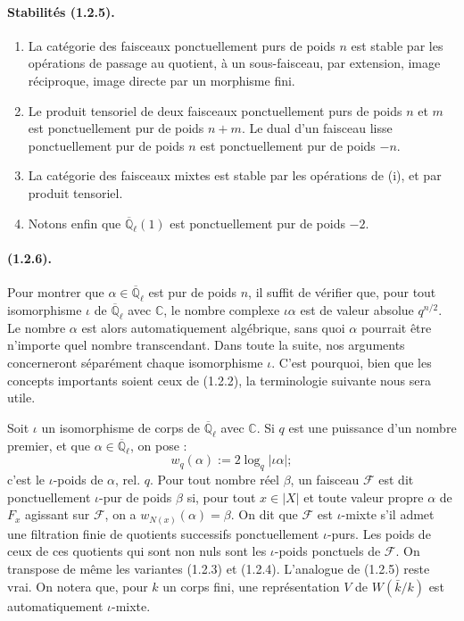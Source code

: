 \documentclass[11pt]{article}
\theoremstyle{remark}
\newcommand{\Qlb}{\overline{\mathbb{Q}}_\ell}
\newcommand{\CC}{\mathbb{C}}
\begin{document}
\paragraph{Stabilités (1.2.5).}
\begin{enumerate}[label=(\roman*)]
\item La catégorie des faisceaux ponctuellement purs de poids $n$ est stable par les opérations de passage au quotient, à un sous-faisceau, par extension, image réciproque, image directe par un morphisme fini.
\item Le produit tensoriel de deux faisceaux ponctuellement purs de poids $n$ et $m$ est ponctuellement pur de poids $n+m$. Le dual d'un faisceau lisse ponctuellement pur de poids $n$ est ponctuellement pur de poids $-n$.
\item La catégorie des faisceaux mixtes est stable par les opérations de (i), et par produit tensoriel.
\item Notons enfin que $\Qlb(1)$ est ponctuellement pur de poids $-2$.
\end{enumerate}

\paragraph{(1.2.6).} Pour montrer que $\alpha\in\Qlb$ est pur de poids $n$, il suffit de vérifier que, pour tout isomorphisme $\iota$ de $\Qlb$ avec $\CC$, le nombre complexe $\iota\alpha$ est de valeur absolue $q^{n/2}$. Le nombre $\alpha$ est alors automatiquement algébrique, sans quoi $\alpha$ pourrait être n'importe quel nombre transcendant. Dans toute la suite, nos arguments concerneront séparément chaque isomorphisme $\iota$. C'est pourquoi, bien que les concepts importants soient ceux de (1.2.2), la terminologie suivante nous sera utile.

Soit $\iota$ un isomorphisme de corps de $\Qlb$ avec $\CC$. Si $q$ est une puissance d'un nombre premier, et que $\alpha\in\Qlb$, on pose :
\begin{equation}
\tag{1.2.6.1}
w_q(\alpha):=2\log_q|\iota\alpha|;
\end{equation}
c'est le $\iota$-poids de $\alpha$, rel. $q$. Pour tout nombre réel $\beta$, un faisceau $\mathcal F$ est dit ponctuellement $\iota$-pur de poids $\beta$ si, pour tout $x\in |X|$ et toute valeur propre $\alpha$ de $F_x$ agissant sur $\mathcal F$, on a $w_{N(x)}(\alpha)=\beta$. On dit que $\mathcal F$ est $\iota$-mixte s'il admet une filtration finie de quotients successifs ponctuellement $\iota$-purs. Les poids de ceux de ces quotients qui sont non nuls sont les $\iota$-poids ponctuels de $\mathcal F$. On transpose de même les variantes (1.2.3) et (1.2.4). L'analogue de (1.2.5) reste vrai. On notera que, pour $k$ un corps fini, une représentation $V$ de $W(\bar k/k)$ est automatiquement $\iota$-mixte.
\end{document}
